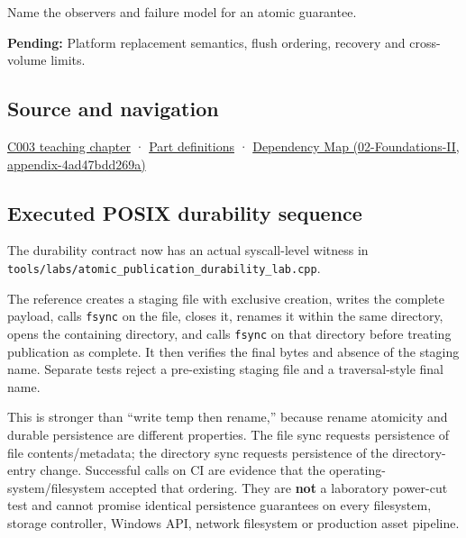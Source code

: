 Name the observers and failure model for an atomic guarantee.

\textbf{Pending:} Platform replacement semantics, flush ordering, recovery and cross-volume limits.

\subsection{Source and navigation}\label{source-and-navigation}

\href{Continuous\%20Notes/Computing\%20Foundations\%20-\%20From\%20Bits\%20to\%20C++\%20and\%20Systems\%20APIs\#Where\%20the\%20bytes\%20live}{C003 teaching chapter} · \hyperref[appendix-fd090d982a15]{Part definitions} · \href{}{Dependency Map (02-Foundations-II, appendix-4ad47bdd269a)}

\subsection{Executed POSIX durability sequence}\label{executed-posix-durability-sequence}

The durability contract now has an actual syscall-level witness in \texttt{tools/labs/atomic\_publication\_durability\_lab.cpp}.

The reference creates a staging file with exclusive creation, writes the complete payload, calls \texttt{fsync} on the file, closes it, renames it within the same directory, opens the containing directory, and calls \texttt{fsync} on that directory before treating publication as complete. It then verifies the final bytes and absence of the staging name. Separate tests reject a pre-existing staging file and a traversal-style final name.

This is stronger than ``write temp then rename,'' because rename atomicity and durable persistence are different properties. The file sync requests persistence of file contents/metadata; the directory sync requests persistence of the directory-entry change. Successful calls on CI are evidence that the operating-system/filesystem accepted that ordering. They are \textbf{not} a laboratory power-cut test and cannot promise identical persistence guarantees on every filesystem, storage controller, Windows API, network filesystem or production asset pipeline.
